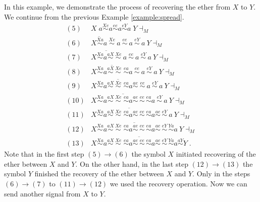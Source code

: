 \begin{example}\label{example:recover}
In this example, we demonstrate the process of recovering the ether from $X$ to $Y$. We continue from the previous Example \ref{example:spread}.
$$
\begin{array}{ll}
(5) & X \; a \stackrel{Xe}{\sim} a \stackrel{ee}{\sim} a \stackrel{eY}{\sim} a \; Y \dashv_M\\
(6) & \overline{X \stackrel{Xa}{\sim} a}\ \stackrel{Xe}{\sim}\ a\ \stackrel{ee}{\sim}\ a\ \stackrel{eY}{\sim}\ a\ Y \dashv_M\\
(7) & \overline{X \stackrel{Xa}{\sim} a \stackrel{aX}{\sim} \, \stackrel{Xe}{\sim}}\ a\ \stackrel{ee}{\sim}\ a\ \stackrel{eY}{\sim}\ a\ Y \dashv_M\\
(8) & \overline{X \stackrel{Xa}{\sim} a \stackrel{aX}{\sim} \, \stackrel{Xe}{\sim} \; \stackrel{ea}{\sim} a}\
\stackrel{ee}{\sim}\ a\ \stackrel{eY}{\sim}\ a\ Y \dashv_M\\
(9) & \overline{X \stackrel{Xa}{\sim} a \stackrel{aX}{\sim} \, \stackrel{Xe}{\sim} \; \stackrel{ea}{\sim} a
\stackrel{ae}{\sim} \ \stackrel{ee}{\sim}}\ a\ \stackrel{eY}{\sim}\ a\ Y \dashv_M\\
(10) & \overline{X \stackrel{Xa}{\sim} a \stackrel{aX}{\sim} \, \stackrel{Xe}{\sim} \; \stackrel{ea}{\sim} a
\stackrel{ae}{\sim} \, \stackrel{ee}{\sim} \, \stackrel{ea}{\sim} a}\ \stackrel{eY}{\sim}\ a\ Y \dashv_M\\
(11) & \overline{X \stackrel{Xa}{\sim} a \stackrel{aX}{\sim} \, \stackrel{Xe}{\sim} \; \stackrel{ea}{\sim} a
\stackrel{ae}{\sim} \, \stackrel{ee}{\sim} \, \stackrel{ea}{\sim} a \stackrel{ae}{\sim} \, \stackrel{eY}{\sim}}\ a\ Y \dashv_M\\
(12) & \overline{X \stackrel{Xa}{\sim} a \stackrel{aX}{\sim} \, \stackrel{Xe}{\sim} \; \stackrel{ea}{\sim} a
\stackrel{ae}{\sim} \, \stackrel{ee}{\sim} \, \stackrel{ea}{\sim} a \stackrel{ae}{\sim} \, \stackrel{eY}{\sim} \, \stackrel{Ya}{\sim} a}\ Y \dashv_M\\
(13) & \overline{X \stackrel{Xa}{\sim} a \stackrel{aX}{\sim} \, \stackrel{Xe}{\sim} \; \stackrel{ea}{\sim} a
\stackrel{ae}{\sim} \, \stackrel{ee}{\sim} \, \stackrel{ea}{\sim} a \stackrel{ae}{\sim} \, \stackrel{eY}{\sim} \, \stackrel{Ya}{\sim} a \stackrel{aY}{\sim} Y}\;.
\end{array}
$$
Note that in the first step $(5) \to (6)$ the symbol $X$ initiated recovering of the ether between $X$ and $Y$. On the other hand, in the last step $(12) \to (13)$ the symbol $Y$ finished the recovery of the ether between $X$ and $Y$. Only in the steps $(6) \to (7)$ to $(11) \to (12)$ we used the recovery operation. Now we can send another signal from $X$ to $Y$.
\end{example}

